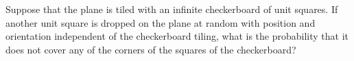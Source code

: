 Suppose that the plane is tiled with an infinite checkerboard of unit squares. If another unit square is dropped on the plane at random with position and orientation independent of the checkerboard tiling, what is the probability that it does not cover any of the corners of the squares of the checkerboard?
